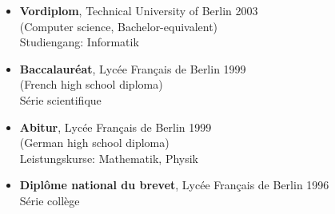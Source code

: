 \documentclass[line,mm]{res}
\newcounter{x}
\newcounter{y}
\newcounter{z}
\begin{document}
\begin{resume}
\begin{itemize}
\item[{[E3]}]
\textbf{Vordiplom}, Technical University of Berlin \hfill 2003 \\
(Computer science, Bachelor-equivalent) \\
Studiengang:  Informatik

\item[{[E4]}]
  \textbf{Baccalauréat}, Lycée Français de Berlin \hfill 1999 \\
  (French high school diploma) \\
Série scientifique

\item[{[E5]}]
\textbf{Abitur}, Lycée Français de Berlin \hfill 1999 \\
  (German high school diploma) \\
Leistungskurse:  Mathematik, Physik 

\item[{[E6]}]
\textbf{Diplôme national du brevet}, Lycée Français de Berlin \hfill 1996 \\
Série collège

\end{itemize}


\end{resume}
\end{document}
